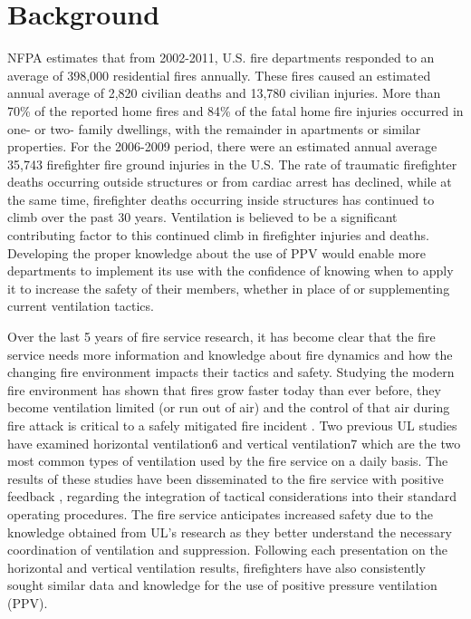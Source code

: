 \documentclass{article}
\begin{document}
\clearpage

\section{Background}
NFPA estimates \cite{NFPAFireLoss} that from 2002-2011, U.S. fire departments responded to an average of 398,000 residential fires annually. These fires caused an estimated annual average of 2,820 civilian deaths and 13,780 civilian injuries. More than 70\% of the reported home fires and 84\% of the fatal home fire injuries occurred in one- or two- family dwellings, with the remainder in apartments or similar properties. For the 2006-2009 period, there were an estimated annual average 35,743 firefighter fire ground injuries in the U.S. \cite{NFPAFFInjuries} The rate of traumatic firefighter deaths occurring outside structures or from cardiac arrest has declined, while at the same time, firefighter deaths occurring inside structures has continued to climb over the past 30 years. \cite{NFPALast30} Ventilation is believed to be a significant contributing factor to this continued climb in firefighter injuries and deaths. Developing the proper knowledge about the use of PPV would enable more departments to implement its use with the confidence of knowing when to apply it to increase the safety of their members, whether in place of or supplementing current ventilation tactics.

Over the last 5 years of fire service research, it has become clear that the fire service needs more information and knowledge about fire dynamics and how the changing fire environment impacts their tactics and safety. Studying the modern fire environment has shown that fires grow faster today than ever before, they become ventilation limited (or run out of air) and the control of that air during fire attack is critical to a safely mitigated fire incident \cite{ChangingResdFires_Kerber}. Two previous UL studies have examined horizontal ventilation6 and vertical ventilation7 which are the two most common types of ventilation used by the fire service on a daily basis. The results of these studies have been disseminated to the fire service with positive feedback \cite{HowToKeepFirefighterSafer_Goldfeder}, \cite{SurbarbanFirefighting_Knapp} regarding the integration of tactical considerations into their standard operating procedures. The fire service anticipates increased safety due to the knowledge obtained from UL’s research as they better understand the necessary coordination of ventilation and suppression. Following each presentation on the horizontal and vertical ventilation results, firefighters have also consistently sought similar data and knowledge for the use of positive pressure ventilation (PPV). 
\end{document}
